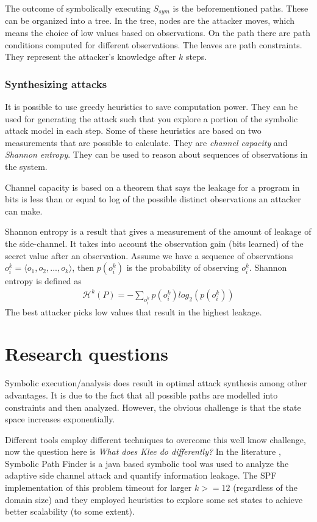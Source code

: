 \documentclass[11pt,a4paper,notitlepage]{article}
\begin{document}
The outcome of symbolically executing $S_{sym}$ is the beforementioned paths. These can be organized into a tree. In the tree, nodes are the attacker moves, which means the choice of low values based on observations. On the path there are path conditions computed for different observations. The leaves are path constraints. They represent the attacker's knowledge after $k$ steps. 

\subsubsection{Synthesizing attacks}
It is possible to use greedy heuristics to save computation power. They can be used for generating the attack such that you explore a portion of the symbolic attack model in each step. Some of these heuristics are based on two measurements that are possible to calculate. They are \textit{channel capacity} and \textit{Shannon entropy}. They can be used to reason about sequences of observations in the system. 

Channel capacity \cite{smithQIF} is based on a theorem that says the leakage for a program in bits is less than or equal to log of the possible distinct observations an attacker can make. 

Shannon entropy is a result that gives a measurement of the amount of leakage of the side-channel. It takes into account the observation gain (bits learned) of the secret value after an observation. Assume we have a sequence of observations $o_i^k = \langle o_1,o_2,...,o_k \rangle$, then $p(o_i^k)$ is the probability of observing $o_i^k$. Shannon entropy is defined as 
\begin{align*}
    \mathcal{H}^k(P) = -\sum_{o_i^k} p(o_i^k) log_2(p(o_i^k))
\end{align*}
The best attacker picks low values that result in the highest leakage.

\section{Research questions}
\label{sec:researchquestions}

Symbolic execution/analysis does result in optimal attack synthesis among other advantages. It is due to the fact that all possible paths are modelled into constraints and then analyzed.
However, the obvious challenge is that the state space increases exponentially.

Different tools employ different techniques to overcome this well know challenge, now the question here is \emph{What does Klee do differently?}
In the literature \cite{phan2017synthesis}, Symbolic Path Finder is a java based symbolic tool was used to analyze the adaptive side channel attack and quantify information leakage.
The SPF implementation of this problem timeout for larger $k >= 12$ (regardless of the domain size) and they employed heuristics to explore some set states to achieve better scalability (to some extent).
\end{document}
